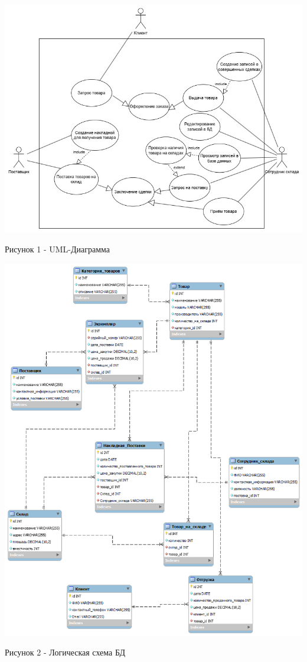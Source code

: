 \documentclass[14pt]{extreport}
\begin{document}
\begin{center}
    \includegraphics[scale=0.5]{UMLBD.jpg}

    Рисунок 1 - UML-Диаграмма
\end{center}

\begin{center}
    \includegraphics[scale=0.5]{Ispravlenniy_wid_dlya_bd_04_of_june.png}

    Рисунок 2 - Логическая схема БД
\end{center}
\end{document}
